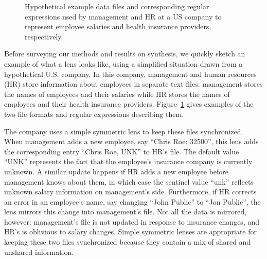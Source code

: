 \documentclass[12pt]{article}
\begin{document}
{\begin{figure}
  \centering
  \caption{Hypothetical example data files and corresponding regular expressions
  used by management and HR at a US company to represent employee salaries and health
  insurance providers, respectively.
  }
  \label{fig:minimized-representations}
\end{figure}

Before surveying our methods and results on synthesis, we quickly sketch an
example of what a lens looks like, using a simplified situation drawn from a
hypothetical U.S. company. In this company, management and human resources
(HR) store information about employees in separate text files: management
stores the names of employees and their salaries while HR stores the names
of employees and their health insurance
providers. Figure~\ref{fig:minimized-representations} gives examples of the
two file formats and regular expressions describing them.

The company uses a simple symmetric lens to keep these files
synchronized. When management adds a new employee, say ``Chris Roe: 32500'',
this lens 
adds the corresponding entry ``Chris Roe, UNK'' to HR's file. The default value
``UNK'' represents the fact that the employee's insurance company is currently
unknown. A similar update happens if HR adds a new employee before
management knows about them,
in which case the sentinel value ``unk'' reflects unknown salary information
on management's side.
Furthermore, if HR corrects an error in an employee's name, say changing ``John
Public'' to ``Jon Public'', the lens mirrors this change into management's
file. Not all the data is mirrored, however: management's file is not updated
in response to insurance changes, and HR's is oblivious to salary
changes. Simple symmetric lenses are appropriate for keeping these two files
synchronized because they contain a mix of shared and unshared information.

}
\end{document}
